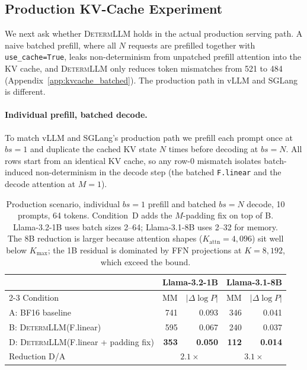 \documentclass{article}
\newcommand{\dllm}{\textsc{DetermLLM}\xspace}
\begin{document}
\subsection{Production KV-Cache Experiment}
\label{sec:kvcache}

We next ask whether \dllm holds in the actual production serving path. A naive
batched prefill, where all $N$ requests are prefilled together with
\texttt{use\_cache=True}, leaks non-determinism from unpatched prefill attention
into the KV cache, and \dllm only reduces token mismatches from 521 to 484
(Appendix~\ref{app:kvcache_batched}). The production path in vLLM and SGLang is
different.

\paragraph{Individual prefill, batched decode.}
To match vLLM and SGLang's production path we prefill each prompt once at
$bs\!=\!1$ and duplicate the cached KV state $N$ times before decoding at
$bs\!=\!N$. All rows start from an identical KV cache, so any row-0 mismatch
isolates batch-induced non-determinism in the decode step (the batched
\texttt{F.linear} and the decode attention at $M\!=\!1$).

\begin{table}[h]
\centering
\caption{Production scenario, individual $bs\!=\!1$ prefill and batched $bs\!=\!N$
  decode, 10 prompts, 64 tokens. Condition~D adds the $M$-padding fix on top of B.
  Llama-3.2-1B uses batch sizes 2--64; Llama-3.1-8B uses 2--32 for memory. The
  8B reduction is larger because attention shapes ($K_{\mathrm{attn}}\!=\!4{,}096$)
  sit well below $K_{\max}$; the 1B residual is dominated by FFN projections at
  $K\!=\!8{,}192$, which exceed the bound.}
\label{tab:kvcache}
\begin{tabular}{lrrrr}
\toprule
& \multicolumn{2}{c}{Llama-3.2-1B} & \multicolumn{2}{c}{Llama-3.1-8B} \\
\cmidrule{2-3}\cmidrule{4-5}
Condition & MM & $|\Delta\log P|$ & MM & $|\Delta\log P|$ \\
\midrule
A: BF16 baseline                  & 741 & 0.093 & 346 & 0.041 \\
B: \dllm (F.linear)               & 595 & 0.067 & 240 & 0.037 \\
D: \dllm (F.linear + padding fix) & \textbf{353} & \textbf{0.050} & \textbf{112} & \textbf{0.014} \\
Reduction D/A                     & \multicolumn{2}{c}{$\mathbf{2.1\times}$} & \multicolumn{2}{c}{$\mathbf{3.1\times}$} \\
\bottomrule
\end{tabular}
\end{table}
\end{document}
